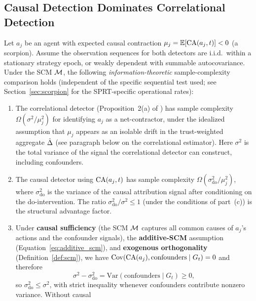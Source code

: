 \subsection{Causal Detection Dominates Correlational Detection}

\begin{proposition}
\label{prop:causal_dominates}
Let $a_j$ be an agent with expected causal contraction $\mu_j =
    \mathbb{E}[\mathrm{CA}(a_j, t)] < 0$ (a scorpion). Assume the
    observation sequences for both detectors are i.i.d.\ within a
    stationary strategy epoch, or weakly dependent with summable
    autocovariance. Under the SCM $\mathcal{M}$, the following
    \emph{information-theoretic} sample-complexity comparison holds
    (independent of the specific sequential test used; see
    Section~\ref{sec:scorpion} for the SPRT-specific operational
    rates):
\begin{enumerate}
\item[\textbf{(a)}] The correlational detector (Proposition~2(a) of
    \citet{lasser2026gfm}) has sample complexity
    $\Omega(\sigma^2 / \mu_j^2)$ for identifying $a_j$ as a
    net-contractor, under the
    idealized assumption that $\mu_j$ appears as an
    isolable drift in the trust-weighted aggregate $\hat{\Delta}$ (see
    paragraph below on the correlational estimator). Here $\sigma^2$
    is the total variance of the signal the correlational detector
    can construct, including confounders.
\item[\textbf{(b)}] The causal detector using $\mathrm{CA}(a_j, t)$
    has sample complexity
    $\Omega(\sigma_{\mathrm{do}}^2 / \mu_j^2)$, where
    $\sigma_{\mathrm{do}}^2$ is the variance of the causal attribution
    signal after conditioning on the do-intervention. The ratio
    $\sigma_{\mathrm{do}}^2 / \sigma^2 \leq 1$ (under the conditions
    of part~(c)) is the structural advantage factor.
\item[\textbf{(c)}] Under \textbf{causal sufficiency} (the SCM
    $\mathcal{M}$ captures all common causes of $a_j$'s actions and the
    confounder signals), the \textbf{additive-SCM} assumption
    (Equation~\eqref{eq:additive_scm}), and \textbf{exogenous
    orthogonality} (Definition~\ref{def:scm}), we have
    $\mathrm{Cov}(\mathrm{CA}(a_j), \mathrm{confounders} \mid G_t) = 0$
    and therefore
    \[
        \sigma^2 - \sigma_{\mathrm{do}}^2
        = \mathrm{Var}(\text{confounders} \mid G_t) \geq 0,
    \]
    so $\sigma_{\mathrm{do}}^2 \leq \sigma^2$, with strict inequality
    whenever confounders contribute nonzero variance. Without causal

\end{enumerate}
\end{proposition}
